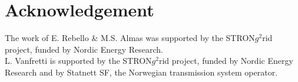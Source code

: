\documentclass[conference]{IEEEtran}
\begin{document}
\section*{Acknowledgement}
The work of E. Rebello \& M.S. Almas was supported by the STRON$g^{2}$rid project, funded by Nordic Energy Research.\\
L. Vanfretti is supported by the STRON$g^{2}$rid project, funded by Nordic Energy Research and by Statnett SF, the Norwegian transmission system operator.

%
%
%
\end{document}
